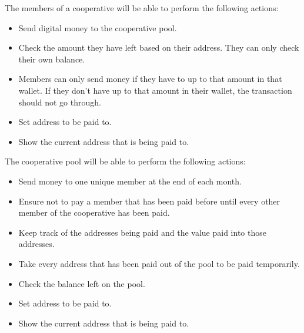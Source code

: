 \documentclass{article}
\begin{document}
\begin{flushleft}
The members of a cooperative will be able to perform the following actions:
\begin{itemize}
    \item Send digital money to the cooperative pool.
    \item Check the amount they have left based on their address. They can only check their own balance.
    \item Members can only send money if they have to up to that amount in that wallet. If they don't have up to that amount in their wallet, the transaction should not go through.
    \item Set address to be paid to.
    \item Show the current address that is being paid to.
\end{itemize}

The cooperative pool will be able to perform the following actions:
\begin{itemize}
    \item Send money to one unique member at the end of each month.
    \item Ensure not to pay a member that has been paid before until every other member of the cooperative has been paid.
    \item Keep track of the addresses being paid and the value paid into those addresses.
    \item Take every address that has been paid out of the pool to be paid temporarily.
    \item Check the balance left on the pool.
    \item Set address to be paid to.
    \item Show the current address that is being paid to.
\end{itemize}


\end{flushleft}
\end{document}
